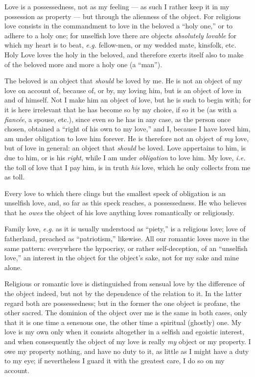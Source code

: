 Love is a possessedness, not as my feeling --- as such I rather keep it in my 
possession as property --- but through the alienness of the object. For 
religious love consists in the commandment to love in the beloved a ``holy 
one,'' or to adhere to a holy one; for unselfish love there are objects 
\textit{absolutely lovable} for which my heart is to beat, \textit{e.g.} 
fellow-men, or my wedded mate, kinsfolk, etc. Holy Love loves the holy in the 
beloved, and therefore exerts itself also to make of the beloved more and more 
a holy one (a ``man'').

The beloved is an object that \textit{should} be loved by me. He is not an 
object of my love on account of, because of, or by, my loving him, but is an 
object of love in and of himself. Not I make him an object of love, but he is 
such to begin with; for it is here irrelevant that he has become so by my 
choice, if so it be (as with a \textit{fianc\'ee}, a spouse, etc.), since even 
so he has in any case, as the person once chosen, obtained a ``right of his 
own to my love,'' and I, because I have loved him, am under obligation to 
love him forever. He is therefore not an object of \textit{my} love, but of 
love in general: an object that \textit{should} be loved. Love appertains to 
him, is due to him, or is his \textit{right}, while I am under 
\textit{obligation} to love him. My love, \textit{i.e.} the toll of love that 
I pay him, is in truth \textit{his} love, which he only collects from me as 
toll.

Every love to which there clings but the smallest speck of obligation is an 
unselfish love, and, so far as this speck reaches, a possessedness. He who 
believes that he \textit{owes} the object of his love anything loves 
romantically or religiously.

Family love, \textit{e.g.} as it is usually understood as ``piety,'' is a 
religious love; love of fatherland, preached as ``patriotism,'' likewise. 
All our romantic loves move in the same pattern: everywhere the hypocrisy, or 
rather self-deception, of an ``unselfish love,'' an interest in the object 
for the object's sake, not for my sake and mine alone.

Religious or romantic love is distinguished from sensual love by the 
difference of the object indeed, but not by the dependence of the relation to 
it. In the latter regard both are possessedness; but in the former the one 
object is profane, the other sacred. The dominion of the object over me is the 
same in both cases, only that it is one time a sensuous one, the other time a 
spiritual (ghostly) one. My love is my own only when it consists altogether in 
a selfish and egoistic interest, and when consequently the object of my love 
is really \textit{my} object or my property. I owe my property nothing, and 
have no duty to it, as little as I might have a duty to my eye; if 
nevertheless I guard it with the greatest care, I do so on my account.

